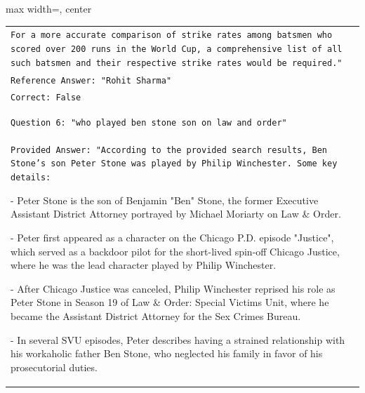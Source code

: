 \documentclass[11pt]{article}
\begin{document}
\begin{table}[ht]
\begin{adjustbox}{max width=\textwidth, center}
\begin{tabular}{>{\raggedright\arraybackslash\tt}p{}<{}}
For a more accurate comparison of strike rates among batsmen who scored over 200 runs in the World Cup, a comprehensive list of all such batsmen and their respective strike rates would be required."\\
Reference Answer: "Rohit Sharma"\\
Correct: False\\
\\
\\
Question 6: "who played ben stone son on law and order"\\
Provided Answer: "According to the provided search results, Ben Stone's son Peter Stone was played by Philip Winchester. Some key details:

- Peter Stone is the son of Benjamin "Ben" Stone, the former Executive Assistant District Attorney portrayed by Michael Moriarty on Law \& Order.

- Peter first appeared as a character on the Chicago P.D. episode "Justice", which served as a backdoor pilot for the short-lived spin-off Chicago Justice, where he was the lead character played by Philip Winchester. 

- After Chicago Justice was canceled, Philip Winchester reprised his role as Peter Stone in Season 19 of Law \& Order: Special Victims Unit, where he became the Assistant District Attorney for the Sex Crimes Bureau.

- In several SVU episodes, Peter describes having a strained relationship with his workaholic father Ben Stone, who neglected his family in favor of his prosecutorial duties.


\end{tabular}
\end{adjustbox}
\end{table}
\end{document}
